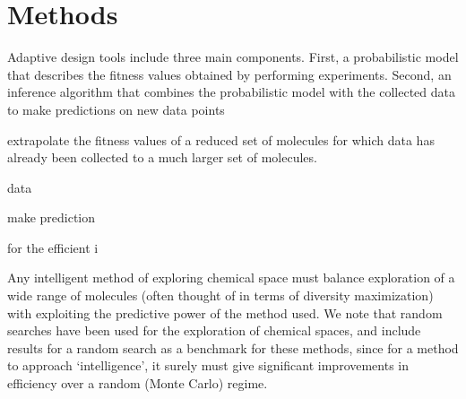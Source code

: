 \section{Methods}

Adaptive design tools include three main components. First, a probabilistic
model that describes the fitness values obtained by performing experiments.
Second, an inference algorithm that combines the probabilistic model with the
collected data to make predictions on new data points 

extrapolate the fitness values of a reduced set of molecules for which data has
already been collected to a much larger set of molecules. 

data 

make prediction

for the efficient i

Any intelligent method of exploring chemical space must balance exploration of a wide range of molecules (often thought of in terms of diversity maximization\cite{Blaney_1997,Wang_2009,Fitzgerald_2006,reker_activelearning_2015}) with exploiting the predictive power of the method used. We note that random searches have been used for the exploration of chemical spaces\cite{23548177}, and include results for a random search as a benchmark for these methods, since for a method to approach `intelligence', it surely must give significant improvements in efficiency over a random (Monte Carlo) regime.


